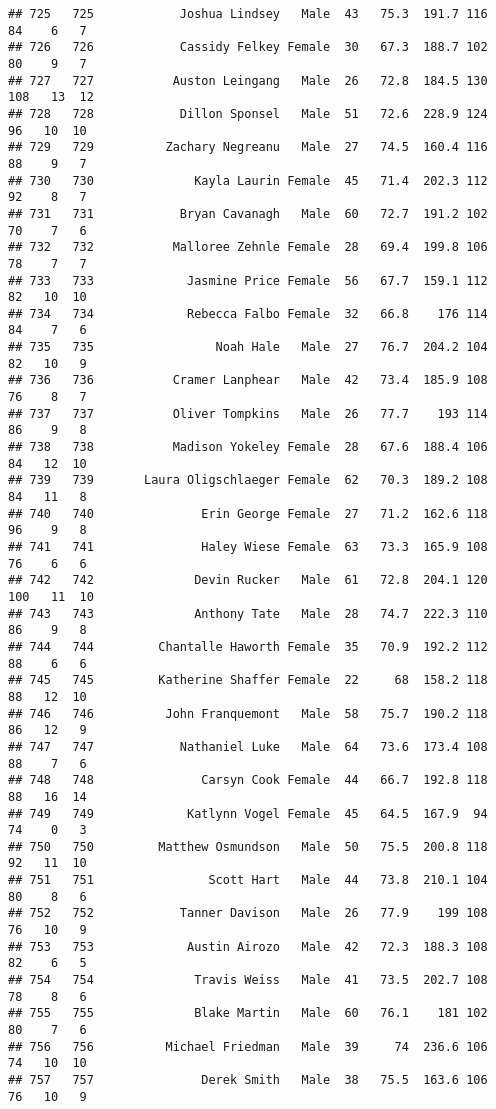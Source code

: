 \documentclass[
]{article}
\begin{document}
\begin{verbatim}
## 725   725            Joshua Lindsey   Male  43   75.3  191.7 116  84    6   7
## 726   726            Cassidy Felkey Female  30   67.3  188.7 102  80    9   7
## 727   727           Auston Leingang   Male  26   72.8  184.5 130 108   13  12
## 728   728            Dillon Sponsel   Male  51   72.6  228.9 124  96   10  10
## 729   729          Zachary Negreanu   Male  27   74.5  160.4 116  88    9   7
## 730   730              Kayla Laurin Female  45   71.4  202.3 112  92    8   7
## 731   731            Bryan Cavanagh   Male  60   72.7  191.2 102  70    7   6
## 732   732           Malloree Zehnle Female  28   69.4  199.8 106  78    7   7
## 733   733             Jasmine Price Female  56   67.7  159.1 112  82   10  10
## 734   734             Rebecca Falbo Female  32   66.8    176 114  84    7   6
## 735   735                 Noah Hale   Male  27   76.7  204.2 104  82   10   9
## 736   736           Cramer Lanphear   Male  42   73.4  185.9 108  76    8   7
## 737   737           Oliver Tompkins   Male  26   77.7    193 114  86    9   8
## 738   738           Madison Yokeley Female  28   67.6  188.4 106  84   12  10
## 739   739       Laura Oligschlaeger Female  62   70.3  189.2 108  84   11   8
## 740   740               Erin George Female  27   71.2  162.6 118  96    9   8
## 741   741               Haley Wiese Female  63   73.3  165.9 108  76    6   6
## 742   742              Devin Rucker   Male  61   72.8  204.1 120 100   11  10
## 743   743              Anthony Tate   Male  28   74.7  222.3 110  86    9   8
## 744   744         Chantalle Haworth Female  35   70.9  192.2 112  88    6   6
## 745   745         Katherine Shaffer Female  22     68  158.2 118  88   12  10
## 746   746          John Franquemont   Male  58   75.7  190.2 118  86   12   9
## 747   747            Nathaniel Luke   Male  64   73.6  173.4 108  88    7   6
## 748   748               Carsyn Cook Female  44   66.7  192.8 118  88   16  14
## 749   749             Katlynn Vogel Female  45   64.5  167.9  94  74    0   3
## 750   750         Matthew Osmundson   Male  50   75.5  200.8 118  92   11  10
## 751   751                Scott Hart   Male  44   73.8  210.1 104  80    8   6
## 752   752            Tanner Davison   Male  26   77.9    199 108  76   10   9
## 753   753             Austin Airozo   Male  42   72.3  188.3 108  82    6   5
## 754   754              Travis Weiss   Male  41   73.5  202.7 108  78    8   6
## 755   755              Blake Martin   Male  60   76.1    181 102  80    7   6
## 756   756          Michael Friedman   Male  39     74  236.6 106  74   10  10
## 757   757               Derek Smith   Male  38   75.5  163.6 106  76   10   9

\end{verbatim}
\end{document}
